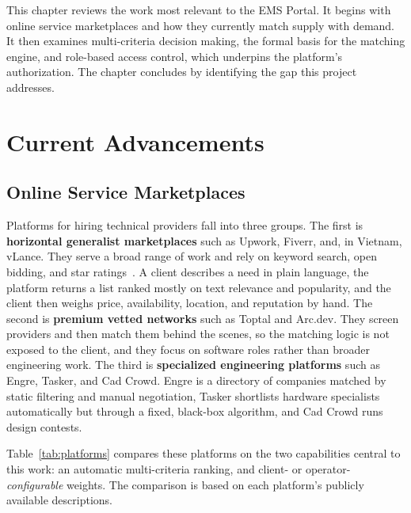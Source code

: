 \label{ch:work}

This chapter reviews the work most relevant to the EMS Portal. It begins with
online service marketplaces and how they currently match supply with demand.
It then examines multi-criteria decision making, the formal basis for the
matching engine, and role-based access control, which underpins the platform's
authorization. The chapter concludes by identifying the gap this project
addresses.

\section{Current Advancements}

\subsection{Online Service Marketplaces}
Platforms for hiring technical providers fall into three groups. The first is
\textbf{horizontal generalist marketplaces} such as Upwork, Fiverr, and, in
Vietnam, vLance. They serve a broad range of work and rely on keyword search,
open bidding, and star ratings~\cite{kassi2019online}. A client describes a need
in plain language, the platform returns a list ranked mostly on text relevance
and popularity, and the client then weighs price, availability, location, and
reputation by hand. The second is \textbf{premium vetted networks} such as
Toptal and Arc.dev. They screen providers and then match them behind the scenes,
so the matching logic is not exposed to the client, and they focus on software
roles rather than broader engineering work. The third is \textbf{specialized
engineering platforms} such as Engre, Tasker, and Cad Crowd. Engre is a
directory of companies matched by static filtering and manual negotiation,
Tasker shortlists hardware specialists automatically but through a fixed,
black-box algorithm, and Cad Crowd runs design contests.

Table~\ref{tab:platforms} compares these platforms on the two capabilities
central to this work: an automatic multi-criteria ranking, and client- or
operator-\textit{configurable} weights. The comparison is based on each
platform's publicly available descriptions.

